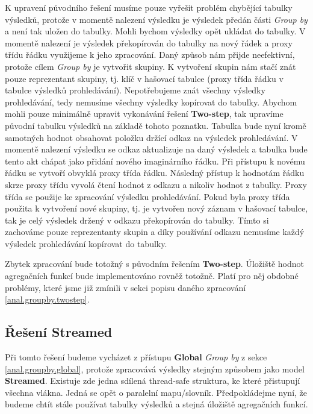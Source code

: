 K upravení původního řešení musíme pouze vyřešit problém chybějící tabulky výsledků, protože v momentě nalezení výsledku je výsledek předán části \textit{Group by} a není tak uložen do tabulky.
Mohli bychom výsledky opět ukládat do tabulky.
V momentě nalezení je výsledek překopírován do tabulky na nový řádek a proxy třídu řádku využijeme k jeho zpracování.
Daný způsob nám přijde neefektivní, protože cílem \textit{Group by} je vytvořit skupiny. 
K vytvoření skupin nám stačí znát pouze reprezentant skupiny, tj. klíč v hašovací tabulce (proxy třída řádku v tabulce výsledků prohledávání).
Nepotřebujeme znát všechny výsledky prohledávání, tedy nemusíme všechny výsledky kopírovat do tabulky.
Abychom mohli pouze minimálně upravit vykonávání řešení \textbf{Two-step}, tak upravíme původní tabulku výsledků na základě tohoto poznatku.
Tabulka bude nyní kromě samotných hodnot obsahovat položku držící odkaz na výsledek prohledávání.
V momentě nalezení výsledku se odkaz aktualizuje na daný výsledek a tabulka bude tento akt chápat jako přidání nového imaginárního řádku.
Při přístupu k novému řádku se vytvoří obvyklá proxy třída řádku.
Následný přístup k hodnotám řádku skrze proxy třídu vyvolá čtení hodnot z odkazu a nikoliv hodnot z tabulky.
Proxy třída se použije ke zpracování výsledku prohledávání.
Pokud byla proxy třída použita k vytvoření nové skupiny, tj. je vytvořen nový záznam v hašovací tabulce, tak je celý výsledek držený v odkazu překopírován do tabulky.
Tímto si zachováme pouze reprezentanty skupin a díky používání odkazu nemusíme každý výsledek prohledávání kopírovat do tabulky.

Zbytek zpracování bude totožný s původním řešením \textbf{Two-step}.
Úložiště hodnot agregačních funkcí bude implementováno rovněž totožně.
Platí pro něj obdobné problémy, které jsme již zmínili v sekci popisu daného zpracování \ref{anal.groupby.twostep}. 

\subsection{Řešení Streamed}

Při tomto řešení budeme vycházet z přístupu \textbf{Global} \textit{Group by} z sekce \ref{anal.groupby.global}, protože zpracovává výsledky stejným způsobem jako model \textbf{Streamed}.
Existuje zde jedna sdílená thread-safe struktura, ke které přistupují všechna vlákna.
Jedná se opět o paralelní mapu/slovník.
Předpokládejme nyní, že budeme chtít stále používat tabulky výsledků a stejná úložiště agregačních funkcí.

